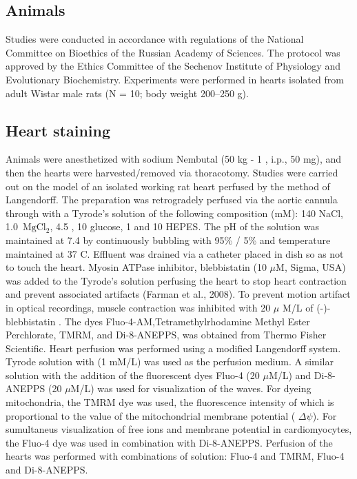 \documentclass{biophys-new}
\begin{document}
\subsection*{Animals}

Studies were conducted in accordance with regulations of the National Committee on Bioethics of the Russian Academy of Sciences.
The protocol was approved by the Ethics Committee of the Sechenov Institute of Physiology and Evolutionary Biochemistry.
Experiments were performed in hearts isolated from adult Wistar male rats (N = 10; body weight 200–250 g).

\subsection*{Heart staining}

Animals were anesthetized with sodium Nembutal (50 kg - 1 , i.p., 50 mg), and then the hearts were harvested/removed via thoracotomy.
Studies were carried out on the model of an isolated working rat heart perfused by the method of Langendorff.
The preparation was retrogradely perfused via the aortic cannula through with a Tyrode’s solution of the following composition (mM): 140 NaCl, 1.0 \(\,\mathrm{Mg}\mathrm{Cl}_2\), 4.5 , 10 glucose, 1  and 10 HEPES.
The pH of the solution was maintained at 7.4 by continuously bubbling with 95\% / 5\%  and temperature maintained at 37 C\degree.
Effluent was drained via a catheter placed in dish so as not to touch the heart.
Myosin ATPase inhibitor, blebbistatin (10 $\mu$M, Sigma, USA) was added to the Tyrode’s solution perfusing the heart to stop heart contraction and prevent associated artifacts (Farman et al., 2008).
To prevent motion artifact in optical recordings, muscle contraction was inhibited with 20 $\mu$ M/L of (-)-blebbistatin \cite{kong2014role}.
The dyes Fluo-4-AM,Tetramethylrhodamine Methyl Ester Perchlorate, TMRM, and Di-8-ANEPPS, was obtained from Thermo Fisher Scientific.
Heart perfusion was performed using a modified Langendorff system. Tyrode solution with  (1 mM/L) was used as the perfusion medium.
A similar solution with the addition of the fluorescent dyes Fluo-4 (20 $\mu$M/L) and Di-8-ANEPPS (20 $\mu$M/L) was used for visualization of the  waves.
For dyeing mitochondria, the TMRM dye was used, the fluorescence intensity of which is proportional to the value of the mitochondrial membrane potential ( $\Delta\psi$).
For sumultaneus visualization of free  ions and membrane potential in cardiomyocytes, the Fluo-4 dye was used in combination with Di-8-ANEPPS.
Perfusion of the hearts was performed with combinations of solution: Fluo-4 and TMRM, Fluo-4 and Di-8-ANEPPS.
\end{document}
